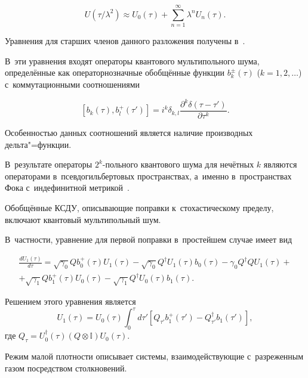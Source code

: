 \[

 U(\tau/\lambda^2) \approx U_0(\tau)+\sum\limits_{n=1}^\infty \lambda^n U_n(\tau).

\]

Уравнения для старших членов данного разложения получены в~\cite{IDAQP2002}. 

В~эти уравнения входят операторы квантового мультипольного шума, определённые как операторнозначные обобщённые функции $b^\pm_k(\tau)$ ($k=1, 2, \dots$) с~коммутационными соотношениями 

\begin{equation}\label{mn}

 [b_k(\tau),b_l^{+}(\tau')]=i^k\delta _{k,l} \frac{\partial^k\delta (\tau-\tau')}{\partial\tau^k}.

\end{equation}

Особенностью данных соотношений является наличие производных дельта"=функции. 

В~результате операторы $2^k$-польного квантового шума для нечётных $k$ являются операторами в~псевдогильбертовых пространствах, а~именно в~пространствах Фока с~индефинитной метрикой~\cite{PechenMN}. 

Обобщённые КСДУ, описывающие поправки к~стохастическому пределу, включают квантовый мультипольный шум. 

В~частности, уравнение для первой поправки в~простейшем случае имеет вид~\cite{IDAQP2002}

\begin{multline*}

\frac{dU_1(\tau)}{d\tau}=\sqrt{\gamma_0}Qb_0^{+}(\tau)U_1(\tau)-\sqrt{\gamma_0}Q^\dagger U_1(\tau)b_0(\tau)-\gamma_0Q^\dagger QU_1(\tau)+\\

 +\sqrt{\gamma_1}Qb_1^{+}(\tau)U_0(\tau)-\sqrt{\gamma_1}Q^\dagger U_0(\tau)b_1(\tau).

\end{multline*}

Решением этого уравнения является $$U_1(\tau)=U_0(\tau)\int_0^\tau d\tau'[Q_{\tau'} b_1^{+}(\tau')-Q^\dagger _{\tau'} b_1(\tau')],$$ где $Q_\tau=U_0^\dagger(\tau)(Q\otimes \mathbb I)U_0(\tau)$.



\smallskip\hypertarget{Sec:LDL}{}


Режим малой плотности описывает системы, взаимодействующие с~разреженным газом посредством столкновений. 

